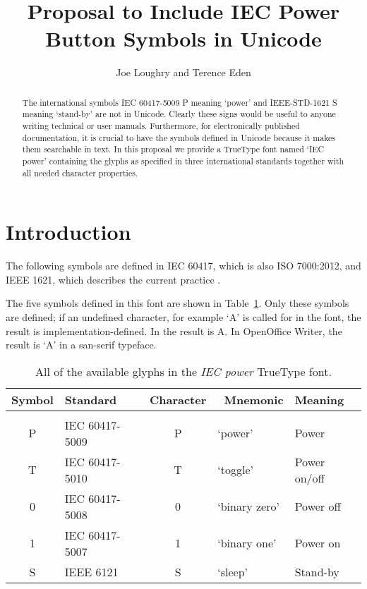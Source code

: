 \documentclass[10pt,letterpaper]{article}
\newcommand{\IEC}[1]{{\fontspec{IECpower}#1}}
\begin{document}
\title{Proposal to Include IEC Power Button Symbols in Unicode}

\author{Joe Loughry and Terence Eden}

\maketitle

\begin{abstract}
The international symbols IEC 60417-5009 \IEC{P} meaning `power' and
IEEE-STD-1621 \IEC{S} meaning `stand-by' are not in Unicode.  Clearly
these signs would be useful to anyone writing technical or user manuals.
Furthermore, for electronically published documentation, it is crucial
to have the symbols defined in Unicode because it makes them searchable
in text.  In this proposal we provide a TrueType font named `IEC power'
containing the glyphs as specified in three international standards
together with all needed character properties.
\end{abstract}

\section{Introduction}

The following symbols are defined in IEC 60417, which is also ISO 7000:2012,
and IEEE 1621, which describes the current practice
\cite{IEEE1621,ISO7000,IEC60417}.

The five symbols defined in this font are shown in Table~\ref{table:symbols}.
Only these symbols are defined; if an undefined character, for example `A' is
called for in the font, the result is implementation-defined. In 
the result is \IEC{A}. In OpenOffice Writer, the result is `A' in a san-serif
typeface.

\begin{table}[htbp]
	\centering
	\begin{tabular}{clcll}
		\textbf{Symbol} & \textbf{Standard} & \textbf{Character} & \
			\textbf{Mnemonic} & \textbf{Meaning} \\
		\hline \\
		\IEC{P} & IEC 60417-5009 & P & `power'       & Power        \\
		\IEC{T} & IEC 60417-5010 & T & `toggle'      & Power on/off \\
		\IEC{0} & IEC 60417-5008 & 0 & `binary zero' & Power off    \\
		\IEC{1} & IEC 60417-5007 & 1 & `binary one'  & Power on     \\
		\IEC{S} & IEEE 6121      & S & `sleep'       & Stand-by     \\
    \end{tabular}
    \caption{All of the available glyphs in the \emph{IEC power} TrueType font.}
    \label{table:symbols} %
\end{table}
\end{document}
